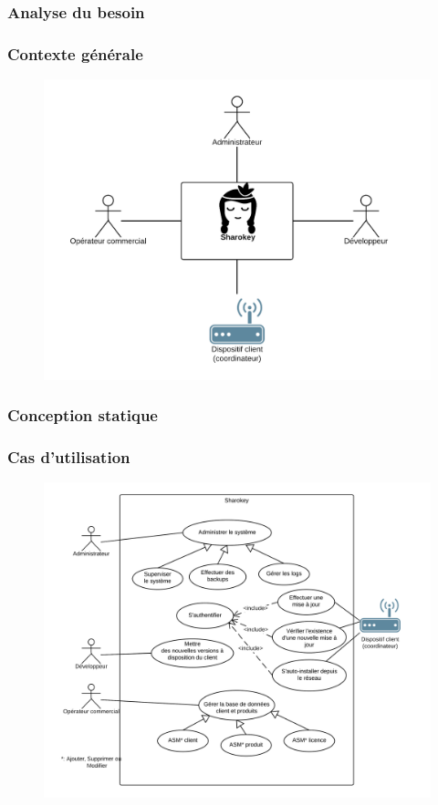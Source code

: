 \documentclass{beamer}
\begin{document}
\subsubsection{Analyse du besoin}
\begin{frame}
\frametitle{Contexte générale}
\begin{figure}
\centering
\includegraphics[scale=0.7]{images/context_general.png}
\end{figure}
\end{frame}
\subsubsection{Conception statique}
\begin{frame}
\frametitle{Cas d'utilisation}
\begin{figure}
\centering
\includegraphics[scale=0.45]{images/use_case_sharokey.png}
\end{figure}
\end{frame}
\end{document}
